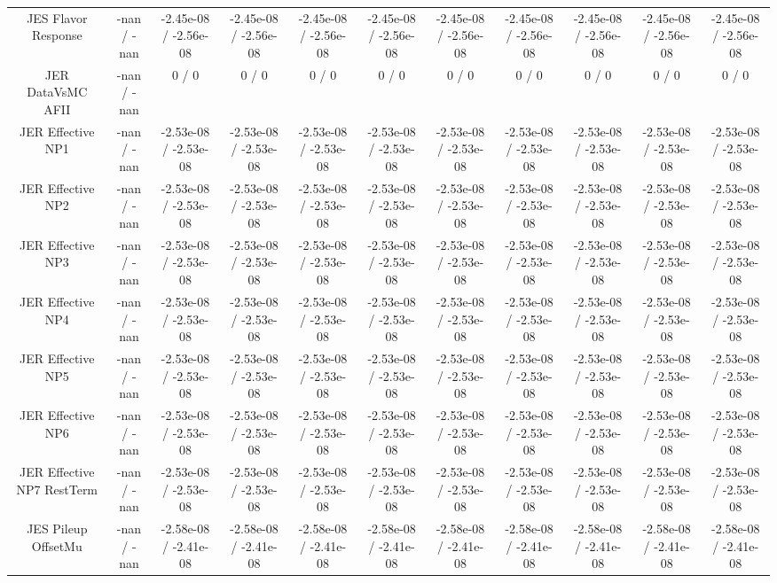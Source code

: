 \begin{table}[htbp]
\begin{center}
\begin{tabular}{|c|c|c|c|c|c|c|c|c|c|c|}
  JES Flavor Response & -nan / -nan & -2.45e-08 / -2.56e-08 & -2.45e-08 / -2.56e-08 & -2.45e-08 / -2.56e-08 & -2.45e-08 / -2.56e-08 & -2.45e-08 / -2.56e-08 & -2.45e-08 / -2.56e-08 & -2.45e-08 / -2.56e-08 & -2.45e-08 / -2.56e-08 & -2.45e-08 / -2.56e-08 \\ 
  JER DataVsMC AFII & -nan / -nan & 0 / 0 & 0 / 0 & 0 / 0 & 0 / 0 & 0 / 0 & 0 / 0 & 0 / 0 & 0 / 0 & 0 / 0 \\ 
  JER Effective NP1 & -nan / -nan & -2.53e-08 / -2.53e-08 & -2.53e-08 / -2.53e-08 & -2.53e-08 / -2.53e-08 & -2.53e-08 / -2.53e-08 & -2.53e-08 / -2.53e-08 & -2.53e-08 / -2.53e-08 & -2.53e-08 / -2.53e-08 & -2.53e-08 / -2.53e-08 & -2.53e-08 / -2.53e-08 \\ 
  JER Effective NP2 & -nan / -nan & -2.53e-08 / -2.53e-08 & -2.53e-08 / -2.53e-08 & -2.53e-08 / -2.53e-08 & -2.53e-08 / -2.53e-08 & -2.53e-08 / -2.53e-08 & -2.53e-08 / -2.53e-08 & -2.53e-08 / -2.53e-08 & -2.53e-08 / -2.53e-08 & -2.53e-08 / -2.53e-08 \\ 
  JER Effective NP3 & -nan / -nan & -2.53e-08 / -2.53e-08 & -2.53e-08 / -2.53e-08 & -2.53e-08 / -2.53e-08 & -2.53e-08 / -2.53e-08 & -2.53e-08 / -2.53e-08 & -2.53e-08 / -2.53e-08 & -2.53e-08 / -2.53e-08 & -2.53e-08 / -2.53e-08 & -2.53e-08 / -2.53e-08 \\ 
  JER Effective NP4 & -nan / -nan & -2.53e-08 / -2.53e-08 & -2.53e-08 / -2.53e-08 & -2.53e-08 / -2.53e-08 & -2.53e-08 / -2.53e-08 & -2.53e-08 / -2.53e-08 & -2.53e-08 / -2.53e-08 & -2.53e-08 / -2.53e-08 & -2.53e-08 / -2.53e-08 & -2.53e-08 / -2.53e-08 \\ 
  JER Effective NP5 & -nan / -nan & -2.53e-08 / -2.53e-08 & -2.53e-08 / -2.53e-08 & -2.53e-08 / -2.53e-08 & -2.53e-08 / -2.53e-08 & -2.53e-08 / -2.53e-08 & -2.53e-08 / -2.53e-08 & -2.53e-08 / -2.53e-08 & -2.53e-08 / -2.53e-08 & -2.53e-08 / -2.53e-08 \\ 
  JER Effective NP6 & -nan / -nan & -2.53e-08 / -2.53e-08 & -2.53e-08 / -2.53e-08 & -2.53e-08 / -2.53e-08 & -2.53e-08 / -2.53e-08 & -2.53e-08 / -2.53e-08 & -2.53e-08 / -2.53e-08 & -2.53e-08 / -2.53e-08 & -2.53e-08 / -2.53e-08 & -2.53e-08 / -2.53e-08 \\ 
  JER Effective NP7 RestTerm & -nan / -nan & -2.53e-08 / -2.53e-08 & -2.53e-08 / -2.53e-08 & -2.53e-08 / -2.53e-08 & -2.53e-08 / -2.53e-08 & -2.53e-08 / -2.53e-08 & -2.53e-08 / -2.53e-08 & -2.53e-08 / -2.53e-08 & -2.53e-08 / -2.53e-08 & -2.53e-08 / -2.53e-08 \\ 
  JES Pileup OffsetMu & -nan / -nan & -2.58e-08 / -2.41e-08 & -2.58e-08 / -2.41e-08 & -2.58e-08 / -2.41e-08 & -2.58e-08 / -2.41e-08 & -2.58e-08 / -2.41e-08 & -2.58e-08 / -2.41e-08 & -2.58e-08 / -2.41e-08 & -2.58e-08 / -2.41e-08 & -2.58e-08 / -2.41e-08 \\ 

\end{tabular}
\end{center}
\end{table}
